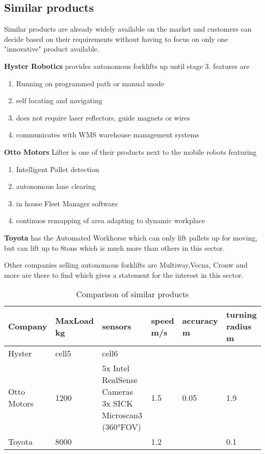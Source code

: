 \documentclass[../report.tex]{subfiles}
\begin{document}
\subsection{Similar products}
Similar products are already widely available on the market and customers can decide based on their requirements
without having to focus on only one "innovative" product available.

\textbf{Hyster Robotics} provides autonomous forklifts up until stage 3.
features are 
\begin{enumerate}
    \item Running on programmed path or manual mode
    \item self locating and navigating
    \item does not require laser reflectors, guide magnets or wires
    \item communicates with WMS warehouse management systems 
\end{enumerate}

\textbf{Otto Motors} Lifter is one of their products next to the mobile robots featuring
\begin{enumerate}
    \item Intelligent Pallet detection
    \item autonomous lane clearing
    \item in house Fleet Manager software
    \item continuos remapping of area adapting to dynamic workplace
\end{enumerate}

\textbf{Toyota} has the Automated Workhorse which can only lift pallets up for moving, but 
can lift up to 8tons which is much more than others in this sector.

Other companies selling autonomous forklifts are Multiway,Vecna, Cronw and more are there to find 
which gives a statement for the interest in this sector. 
\begin{table}
    \begin{tabularx}{\linewidth}{| L || L | L | L | L | L | } 
        \hline
        Company& MaxLoad kg & sensors & speed m/s & accuracy m & turning radius m \\ 
        \hline
        \hline
        Hyster & cell5 & cell6 & & & \\ 
        \hline
        Otto Motors & 1200 & 5x Intel RealSense Cameras 3x SICK Microscan3 (360°FOV)& 1.5 & 0.05 & 1.9\\ 
        \hline
        Toyota & 8000 & & 1.2 & &0.1\\
        \hline
      \end{tabularx}
      \caption{Comparison of similar products}
\end{table}
\end{document}
